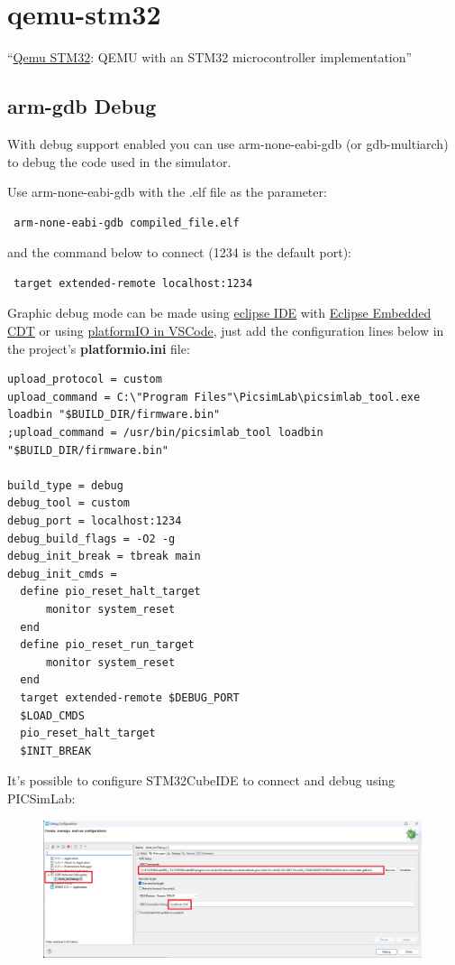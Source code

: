  \section{qemu-stm32} \hypertarget{def:qemu-stm32}{}
 ``\href{http://beckus.github.io/qemu_stm32/}{Qemu STM32}: QEMU with an STM32 microcontroller implementation''
 
 \subsection{arm-gdb Debug} \hypertarget{def:gdbarm}{}
 
 With debug support enabled you can use arm-none-eabi-gdb (or gdb-multiarch) to debug the code used in the simulator. 
 
 Use arm-none-eabi-gdb with the .elf file as the parameter:
 \begin{verbatim}
 arm-none-eabi-gdb compiled_file.elf
 \end{verbatim}
 and the command below to connect (1234 is the default port):
 \begin{verbatim}
 target extended-remote localhost:1234
 \end{verbatim}

Graphic debug mode can be made using \href{https://www.eclipse.org/}{eclipse IDE} with 
\href{https://projects.eclipse.org/projects/iot.embed-cdt}{Eclipse Embedded CDT} or using \href{https://platformio.org/}{platformIO in VSCode}, just add the configuration lines below in the project's \textbf{platformio.ini} file:
\begin{verbatim}
upload_protocol = custom
upload_command = C:\"Program Files"\PicsimLab\picsimlab_tool.exe loadbin "$BUILD_DIR/firmware.bin"
;upload_command = /usr/bin/picsimlab_tool loadbin "$BUILD_DIR/firmware.bin"

build_type = debug
debug_tool = custom
debug_port = localhost:1234
debug_build_flags = -O2 -g
debug_init_break = tbreak main
debug_init_cmds =
  define pio_reset_halt_target
      monitor system_reset
  end
  define pio_reset_run_target
      monitor system_reset
  end
  target extended-remote $DEBUG_PORT
  $LOAD_CMDS
  pio_reset_halt_target
  $INIT_BREAK
\end{verbatim}

It's possible to configure STM32CubeIDE to connect and debug using PICSimLab:

\begin{figure}[H]
\center
\includegraphics[width=0.99\textwidth]{img/configcube.png} 
\end{figure} 

